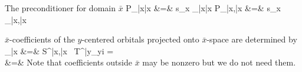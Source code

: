 \documentclass[aps,prl,twocolumn,reprint,amsmath,amssymb]{revtex4-1}
\begin{document}
The preconditioner for domain $\bar{x}$
%
\bea
P_{\bar{x}\bar{x}} &=& s_x _{\bar{x}\bar{x}} 
\eea 
%
\bea
P_{\bar{x}\mu,\bar{x}\nu} &=& s_x _{\bar{x}\mu,\bar{x}\nu} 
\eea 

$\bar{x}$-coefficients of the $y$-centered orbitals projected onto $\bar{x}$-space are determined by
%
\bea
{}_{\bar{x}}   &=&  S^{\bar{x}\mu,\bar{x}\nu} \, {T^{\bar{y}\lambda}}_{yi} = \nonumber \\
 &=&  
\eea 
%
Note that coefficients outside $\bar{x}$ may be nonzero but we do not need them.
\end{document}
